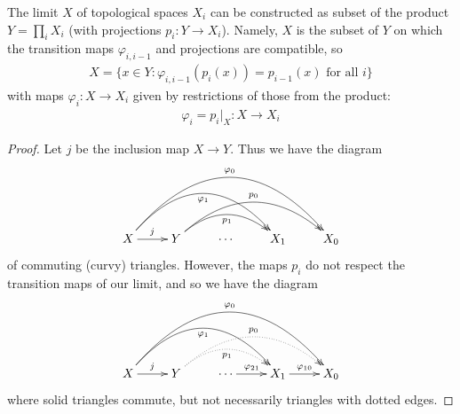       \begin{claim}
        The limit $X$ of topological spaces $X_i$ can be constructed as subset of the product $Y=\prod_i X_i$ (with projections $p_i:Y\rightarrow X_i$).
        Namely, $X$ is the subset of $Y$ on which the transition maps $\varphi_{i,i-1}$ and projections are compatible, so
        \begin{align*}
          X = \{x\in Y: \varphi_{i,i-1}(p_i(x)) = p_{i-1}(x) \text{ for all } i\}
        \end{align*}
        with maps $\varphi_i:X\rightarrow X_i$ given by restrictions of those from the product:
        \begin{align*}
          \varphi_i = p_i|_X :X\rightarrow X_i
        \end{align*}
        \begin{proof}
          Let $j$ be the inclusion map $X\rightarrow Y$.
          Thus we have the diagram
          \begin{displaymath}
            \xymatrix{
              X \ar[r]^j \ar@/^37pt/[rrr]_{\varphi_1} \ar@/^50pt/[rrrr]^{\varphi_0}
              & Y \ar@/^20pt/[rr]_{p_1} \ar@/^30pt/[rrr]^{p_0}
              & \cdots
              & X_1
              & X_0
            }
          \end{displaymath}
          of commuting (curvy) triangles.
          However, the maps $p_i$ do not respect the transition maps of our limit, and so we have the diagram
          \begin{displaymath}
            \xymatrix{
              X \ar[r]^j \ar@/^37pt/[rrr]_{\varphi_1} \ar@/^50pt/[rrrr]^{\varphi_0}
              & Y \ar@/^20pt/@{..>}[rr]_{p_1} \ar@/^30pt/@{..>}[rrr]^{p_0}
              & \cdots \ar[r]^{\varphi_{21}}
              & X_1 \ar[r]^{\varphi_{10}}
              & X_0
            }
          \end{displaymath}
          where solid triangles commute, but not necessarily triangles with dotted edges.
          

\end{proof}
\end{claim}
